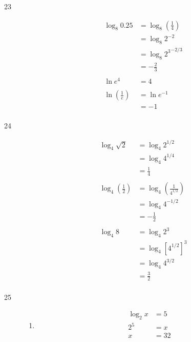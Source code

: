 \documentclass{exam}
\begin{document}
\begin{description}
    \item[23]
      \begin{align*}
        \log_{8} 0.25 &= \log_8 \left( \frac{1}{4} \right) \\
                      &= \log_8 2^{-2} \\
                      &= \log_8 {2^3}^{-2/3} \\
                      &= - \frac{2}{3} \\
        \\
        \ln e^4 &= 4 \\
        \\
        \ln \left( \frac{1}{e} \right) &= \ln e^{-1} \\
                                       &= -1 \\
      \end{align*}

    \item[24]
      \begin{align*}
        \log_4 \sqrt{2} &= \log_4 2^{1/2} \\
                        &= \log_4 4^{1/4} \\
                        &= \frac{1}{4} \\
        \\
        \log_4 \left( \frac{1}{2} \right) &= \log_4 \left( \frac{1}{4^{1/2}} \right) \\
                                          &= \log_4 4^{-1/2} \\
                                          &= - \frac{1}{2} \\
        \\
        \log_4 8 &= \log_4 2^3 \\
                 &= \log_4 \left[ 4^{1/2} \right]^3 \\
                 &= \log_4 4^{3/2} \\
                 &= \frac{3}{2} \\
      \end{align*}

    \item[25]
      \begin{enumerate}[a]
        \item 
          \begin{align*}
            \log_2 x &= 5 \\
            2^5      &= x \\
            x        &= 32 \\
          \end{align*}


\end{enumerate}
\end{description}
\end{document}
